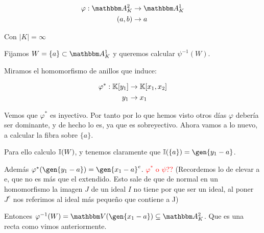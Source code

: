 \begin{example}
	\begin{align*}
	\varphi: \A^2_K & \rightarrow \A^1_K \\
	(a,b) & \rightarrow a
	\end{align*}

	Con $|K|=\infty$

	Fijamos $W=\{a\} \subset \A_K^1$ y queremos calcular $\psi^{-1}(W)$.

	Miramos el homomorfismo de anillos que induce:

	\begin{align*}
	\varphi^*: \mathbb{K}[y_1] & \rightarrow \mathbb{K}[x_1,x_2] \\
	y_1 & \rightarrow x_1
	\end{align*}

	Vemos que $\varphi^*$ es inyectivo. Por tanto por lo que hemos visto otros días $\varphi$ debería ser dominante, y de hecho lo es, ya que es sobreyectivo. Ahora vamos a lo nuevo, a calcular la fibra sobre $\{a\}$.

	Para ello calculo $\mathbb{I}(W)$, y tenemos claramente que $\I(\{a\})=\gen{y_1 -a}$.

	Además $\varphi^*(\gen{y_1-a})=\gen{x_1-a}^e$. \textcolor{red}{$\varphi^*$ o $\psi$??} (Recordemos lo de elevar a e, que no es más que el extendido. Esto sale de que de normal en un homomorfismo la imagen $J$ de un ideal $I$ no tiene por que ser un ideal, al poner $J^e$ nos referimos al ideal más pequeño que contiene a J)

	Entonces $\varphi^{-1}(W)= \V(\gen{x_1-a}) \subseteq \A^2_K$. Que es una recta como vimos anteriormente.
\end{example}


